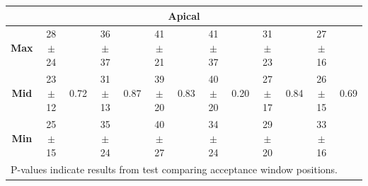 \begin{landscape}
\begin{table}
\begin{tabular}{ccccccccccccc}
			\multicolumn{13}{c}{\textbf{Apical}} \\
			\midrule
			\textbf{Max} & 28$\pm$24 & \multirow{3}{*}{0.72} & 36$\pm$37 & \multirow{3}{*}{0.87} & 41$\pm$21 & \multirow{3}{*}{0.83}
			& 41$\pm$37 & \multirow{3}{*}{0.20} & 31$\pm$23 & \multirow{3}{*}{0.84} & 27$\pm$16 & \multirow{3}{*}{0.69} \\
			\textbf{Mid} & 23$\pm$12 &                       & 31$\pm$13 &                       & 39$\pm$20 & 
			& 40$\pm$20 &                       & 27$\pm$17 &                       & 26$\pm$15 &                       \\
			\textbf{Min} & 25$\pm$15 &                       & 35$\pm$24 &                       & 40$\pm$27 & 
			& 34$\pm$24 &                       & 29$\pm$20 &                       & 33$\pm$16 &  \\ 
			\bottomrule
			\multicolumn{13}{l}{P-values indicate results from test comparing acceptance window positions.}
		\end{tabular}
	\end{table}
	\end{landscape}

